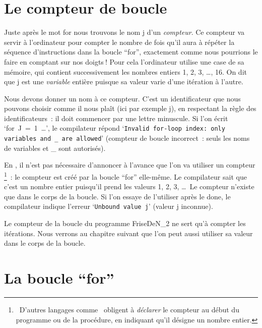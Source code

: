 \section{Le compteur de boucle}

Juste après le mot {\mcl for} nous trouvons le nom {\idt j} d'un
{\em compteur}. Ce compteur va servir à l'ordinateur pour
compter le nombre de fois qu'il aura à répéter la séquence d'instructions dans la
boucle ``for'', exactement comme nous pourrions le faire en comptant sur nos  doigts$\:$!
Pour cela l'ordinateur utilise une case de sa mémoire, qui contient successivement
les nombres entiers 1, 2, 3, \ldots, 16. On dit que {\idt j} est une
{\em variable} entière puisque sa valeur varie
d'une itération à l'autre.

Nous devons donner un nom à ce compteur. C'est un identificateur que nous pouvons choisir
comme il nous plaît (ici par exemple {\idt  j}), en respectant la règle des
identificateurs~: il doit commencer par une lettre minuscule. Si l'on écrit
`{\mcl for}\ {\idt J\ =\ 1}\ \ldots', le compilateur répond
`{\tt Invalid for-loop index: only variables and \_ are allowed}'
(compteur de boucle incorrect~: seuls les noms de variables et \_ sont autorisés).

En \ocaml, il n'est pas nécessaire d'annoncer à l'avance que l'on va utiliser
un compteur%
\footnote{\ D'autres langages comme \pascal\ obligent à {\em déclarer} le compteur au début
du programme ou de la procédure, en indiquant qu'il désigne un nombre entier.}~:
le compteur est créé par la boucle ``for'' elle-même. Le compilateur
sait que c'est un nombre entier puisqu'il prend les valeurs 1, 2, 3, \ldots\ Le compteur n'existe
que dans le corps de la boucle. Si l'on essaye de l'utiliser après le {\mcl done}, le
compilateur indique l'erreur `{\tt Unbound value j}' (valeur {\idt j} inconnue).

Le compteur de la boucle du programme {\idt FriseDeN\_2} ne sert qu'à compter les itérations.
Nous verrons au chapitre suivant que l'on peut aussi utiliser sa valeur dans le corps de
la boucle.

\section{La boucle ``for''}

